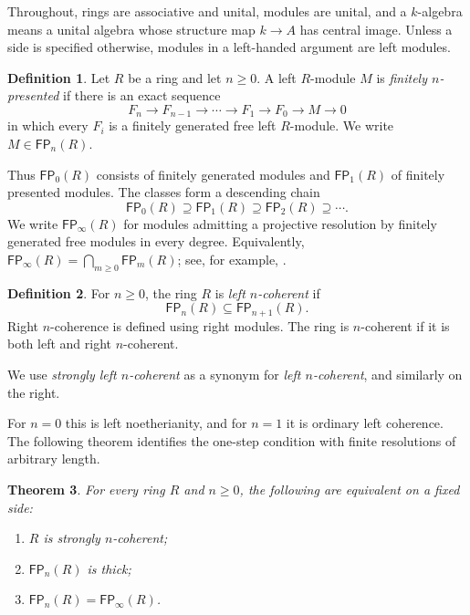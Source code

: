 \documentclass[11pt]{article}
\numberwithin{equation}{section}
\newtheorem{theorem}{Theorem}[section]
\theoremstyle{definition}
\newtheorem{definition}[theorem]{Definition}
\theoremstyle{remark}
\newcommand{\FP}{\mathsf{FP}}
\begin{document}
Throughout, rings are associative and unital, modules are unital, and a
$k$-algebra means a unital algebra whose structure map $k\to A$ has central
image.  Unless a side is specified otherwise, modules in a left-handed
argument are left modules.

\begin{definition}\label{sy:def:FPn}
Let $R$ be a ring and let $n\geq0$.  A left $R$-module $M$ is
\emph{finitely $n$-presented} if there is an exact sequence
\[
F_n\longrightarrow F_{n-1}\longrightarrow\cdots
\longrightarrow F_1\longrightarrow F_0\longrightarrow M\longrightarrow0
\]
in which every $F_i$ is a finitely generated free left $R$-module.  We
write $M\in\FP_n(R)$.
\end{definition}

Thus $\FP_0(R)$ consists of finitely generated modules and $\FP_1(R)$ of
finitely presented modules.  The classes form a descending chain
\[
\FP_0(R)\supseteq\FP_1(R)\supseteq\FP_2(R)\supseteq\cdots.
\]
We write $\FP_\infty(R)$ for modules admitting a projective resolution by
finitely generated free modules in every degree.  Equivalently,
$\FP_\infty(R)=\bigcap_{m\geq0}\FP_m(R)$; see, for example,
\cite{BravoPerez}.

\begin{definition}\label{sy:def:ncoh}
For $n\geq0$, the ring $R$ is \emph{left $n$-coherent} if
\[
\FP_n(R)\subseteq\FP_{n+1}(R).
\]
Right $n$-coherence is defined using right modules.  The ring is
$n$-coherent if it is both left and right $n$-coherent.
\end{definition}

We use \emph{strongly left $n$-coherent} as a synonym for
\emph{left $n$-coherent}, and similarly on the right.

For $n=0$ this is left noetherianity, and for $n=1$ it is ordinary left
coherence.  The following theorem identifies the one-step condition with
finite resolutions of arbitrary length.
\begin{theorem}\label{sc:thm:BP-stabilization}
For every ring $R$ and $n\ge0$, the following are equivalent on a fixed
side:
\begin{enumerate}[label=(\roman*)]
\item $R$ is strongly $n$-coherent;
\item $\FP_n(R)$ is thick;
\item $\FP_n(R)=\FP_\infty(R)$.
\end{enumerate}
\end{theorem}
\end{document}
